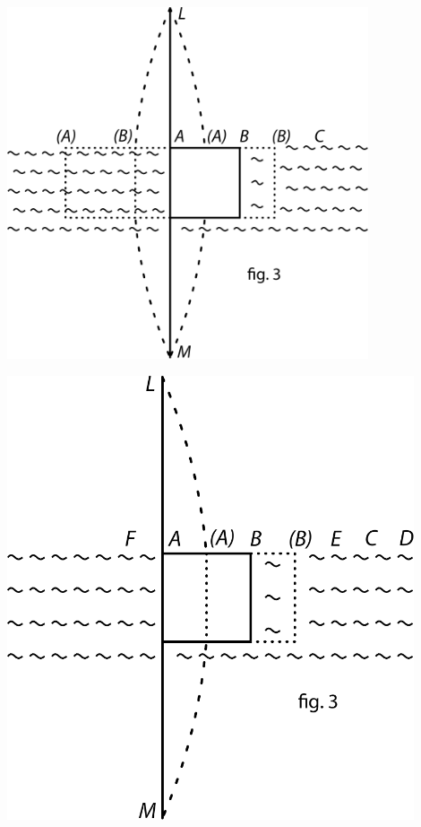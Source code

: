 \begin{minipage}[t]{0.5\textwidth}
\includegraphics[width=0.8\textwidth]{gesamttex/edit_VIII,3/images/LH_37_01_018-019_d3a.pdf}
\vspace{1em}
\end{minipage}
\hspace{3,3mm}
\begin{minipage}[t]{0.5\textwidth}
\includegraphics[width=0.9\textwidth]{gesamttex/edit_VIII,3/images/LH_37_01_018-019_d3b.pdf}
\end{minipage}

